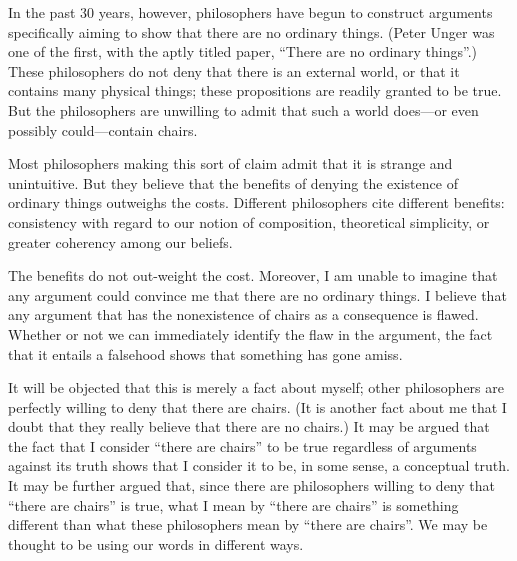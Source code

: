 \documentclass[11pt]{article}
\begin{document}
\begin{spacing}{1.25}
In the past 30 years, however, philosophers have begun to construct
arguments specifically aiming to show that there are no ordinary
things.  (Peter Unger was one of the first, with the aptly titled
paper, ``There are no ordinary things''.)  These philosophers do not
deny that there is an external world, or that it contains many
physical things; these propositions are readily granted to be true.
But the philosophers are unwilling to admit that such a world
does---or even possibly could---contain chairs.

Most philosophers making this sort of claim admit that it is strange
and unintuitive.  But they believe that the benefits of denying the
existence of ordinary things outweighs the costs.  Different
philosophers cite different benefits: consistency with regard to our
notion of composition, theoretical simplicity, or greater coherency
among our beliefs.  

The benefits do not out-weight the cost.  Moreover, I am unable to
imagine that any argument could convince me that there are no ordinary
things.  I believe that any argument that has the nonexistence of
chairs as a consequence is flawed.  Whether or not we can immediately
identify the flaw in the argument, the fact that it entails a
falsehood shows that something has gone amiss.

It will be objected that this is merely a fact about myself; other
philosophers are perfectly willing to deny that there are chairs.  (It
is another fact about me that I doubt that they really believe that
there are no chairs.)  It may be argued that the fact that I consider
``there are chairs'' to be true regardless of arguments against its
truth shows that I consider it to be, in some sense, a conceptual
truth.  It may be further argued that, since there are philosophers
willing to deny that ``there are chairs'' is true, what I mean by
``there are chairs'' is something different than what these
philosophers mean by ``there are chairs''.  We may be thought to be
using our words in different ways.


\end{spacing}
\end{document}
